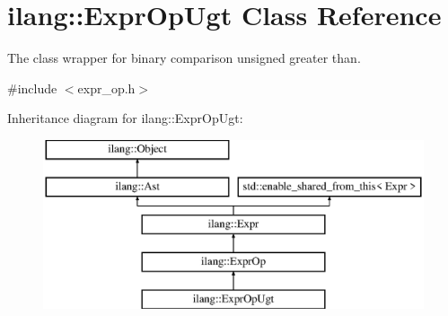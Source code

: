 \hypertarget{classilang_1_1_expr_op_ugt}{}\section{ilang\+:\+:Expr\+Op\+Ugt Class Reference}
\label{classilang_1_1_expr_op_ugt}


The class wrapper for binary comparison unsigned greater than.  




{\ttfamily \#include $<$expr\+\_\+op.\+h$>$}

Inheritance diagram for ilang\+:\+:Expr\+Op\+Ugt\+:\begin{figure}[H]
\begin{center}
\leavevmode
\includegraphics[height=5.000000cm]{classilang_1_1_expr_op_ugt}
\end{center}
\end{figure}
